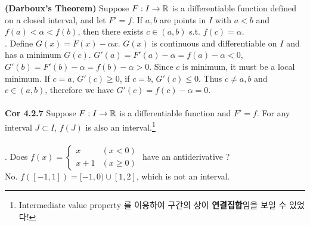  \textbf{(Darboux's Theorem)} Suppose $F:I\rightarrow\mathbb{R}$ is a differentiable function defined on a closed interval, and let $F'=f$. If $a, b$ are points in $I$ with $a < b$ and $f(a) < \alpha < f(b)$, then there exists $c\in (a, b)$ s.t. $f(c) = \alpha$.\\
\pf. Define $G(x) = F(x) - \alpha x$. $G(x)$ is continuous and differentiable on $I$ and has a minimum $G(c)$. $G'(a) = F'(a) - \alpha = f(a) - \alpha < 0$, $G'(b) = F'(b) - \alpha = f(b) - \alpha > 0$. Since $c$ is minimum, it must be a local minimum. If $c = a$, $G'(c) \geq 0$, if $c = b$, $G'(c) \leq 0$. Thus $c \neq a, b$ and $c \in (a, b)$, therefore we have $G'(c) = f(c) - \alpha = 0$. \\
\\
\textbf{Cor 4.2.7} Suppose $F:I\rightarrow\mathbb{R}$ is a differentiable function and $F'=f$. For any interval $J\subset I$, $f(J)$ is also an interval.\footnote{Intermediate value property 를 이용하여 구간의 상이 \textbf{연결집합}임을 보일 수 있었다!}\\
\\
\ex. Does $f(x) = \begin{cases}
	x & (x < 0) \\ x + 1 & (x \geq 0)
\end{cases}$ have an antiderivative ?\\
No. $f([-1, 1]) = [-1, 0) \cup [1, 2]$, which is not an interval.~\\

